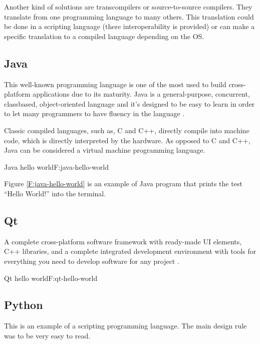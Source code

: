 Another kind of solutions are transcompilers or source-to-source compilers. They
translate from one programming language to many others. This translation could
be done in a scripting language (there interoperability is provided) or can make
a specific translation to a compiled language depending on the OS.

\subsection{Java}

This well-known programming language is one of the most used to build
cross-platform applications due to its maturity. Java is a general-purpose,
concurrent, classbased, object-oriented language and it's designed to be easy
to learn in order to let many programmers to have fluency in the language
\cite{java-8-specs}.

Classic compiled languages, such as, C and C++, directly compile into machine
code, which is directly interpreted by the hardware. As opposed to C and C++,
Java can be considered a virtual machine programming language.

\begin{codefigure}{Java hello world}{F:java-hello-world}
\end{codefigure}

Figure \ref{F:java-hello-world} is an example of Java program that prints the
test “Hello World!” into the terminal.

\subsection{Qt}

A complete cross-platform software framework with ready-made UI elements, C++ 
libraries, and a complete integrated development environment with tools for 
everything you need to develop software for any project \cite{qt-web}.

\begin{codefigure}{Qt hello world}{F:qt-hello-world}
\end{codefigure}

\subsection{Python}

This is an example of a scripting programming language. The main design rule
was to be very easy to read.

